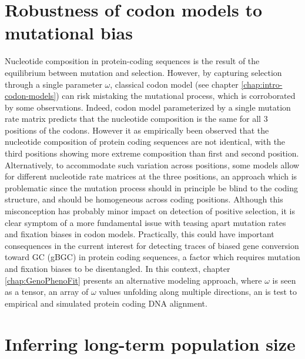 \section{Robustness of codon models to mutational bias}
\label{sec-goals:NucleotideBias}

Nucleotide composition in protein-coding sequences is the result of the equilibrium between mutation and selection.
However, by capturing selection through a single parameter $\omega$, classical codon model (see chapter \ref{chap:intro-codon-models}) can risk mistaking the mutational process, which is corroborated by some observations. 
Indeed, codon model parameterized by a single mutation rate matrix predicts that the nucleotide composition is the same for all $3$ positions of the codons.
However it as empirically been observed that the nucleotide composition of protein coding sequences are not identical, with the third positions showing more extreme composition than first and second position.
Alternatively, to accommodate such variation across positions, some models allow for different nucleotide rate matrices at the three positions, an approach which is problematic since the mutation process should in principle be blind to the coding structure, and should be homogeneous across coding positions.
Although this misconception has probably minor impact on detection of positive selection, it is clear symptom of a more fundamental issue with teasing apart mutation rates and fixation biases in codon models.
Practically, this could have important consequences in the current interest for detecting traces of biased gene conversion toward GC (gBGC) in protein coding sequences, a factor which requires mutation and fixation biases to be disentangled.
In this context, chapter \ref{chap:GenoPhenoFit} presents an alternative modeling approach, where $\omega$ is seen as a tensor, an array of $\omega$ values unfolding along multiple directions, an  is test to empirical and simulated protein coding DNA alignment.

\section{Inferring long-term population size}
\label{sec-goals:MutSelDrift}

